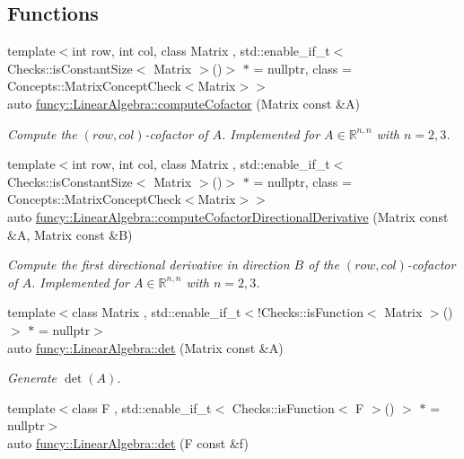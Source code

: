 \subsection*{Functions}
\begin{DoxyCompactItemize}
\item 
{\footnotesize template$<$int row, int col, class Matrix , std\-::enable\-\_\-if\-\_\-t$<$ Checks\-::is\-Constant\-Size$<$ Matrix $>$()$>$ $\ast$  = nullptr, class  = Concepts\-::\-Matrix\-Concept\-Check$<$\-Matrix$>$$>$ }\\auto \hyperlink{group__LinearAlgebraGroup_gab15cdaf462f65ca62d0b810e3413c515}{funcy\-::\-Linear\-Algebra\-::compute\-Cofactor} (Matrix const \&A)
\begin{DoxyCompactList}\small\item\em Compute the $(row,col)$-\/cofactor of $ A $. Implemented for $ A\in \mathbb{R}^{n,n} $ with $ n=2,3 $. \end{DoxyCompactList}\item 
{\footnotesize template$<$int row, int col, class Matrix , std\-::enable\-\_\-if\-\_\-t$<$ Checks\-::is\-Constant\-Size$<$ Matrix $>$()$>$ $\ast$  = nullptr, class  = Concepts\-::\-Matrix\-Concept\-Check$<$\-Matrix$>$$>$ }\\auto \hyperlink{group__LinearAlgebraGroup_ga226879a7c479a138381887890964ecf8}{funcy\-::\-Linear\-Algebra\-::compute\-Cofactor\-Directional\-Derivative} (Matrix const \&A, Matrix const \&B)
\begin{DoxyCompactList}\small\item\em Compute the first directional derivative in direction $ B $ of the $(row,col)$-\/cofactor of $ A $. Implemented for $ A\in \mathbb{R}^{n,n} $ with $ n=2,3 $. \end{DoxyCompactList}\item 
{\footnotesize template$<$class Matrix , std\-::enable\-\_\-if\-\_\-t$<$!\-Checks\-::is\-Function$<$ Matrix $>$()$>$ $\ast$  = nullptr$>$ }\\auto \hyperlink{group__LinearAlgebraGroup_ga9676ad43c090d3e4678751a4bfd1928c}{funcy\-::\-Linear\-Algebra\-::det} (Matrix const \&A)
\begin{DoxyCompactList}\small\item\em Generate $\det(A)$. \end{DoxyCompactList}\item 
{\footnotesize template$<$class F , std\-::enable\-\_\-if\-\_\-t$<$ Checks\-::is\-Function$<$ F $>$() $>$ $\ast$  = nullptr$>$ }\\auto \hyperlink{group__LinearAlgebraGroup_ga07176275cabe079e805621b5a2c25813}{funcy\-::\-Linear\-Algebra\-::det} (F const \&f)

\end{DoxyCompactItemize}
